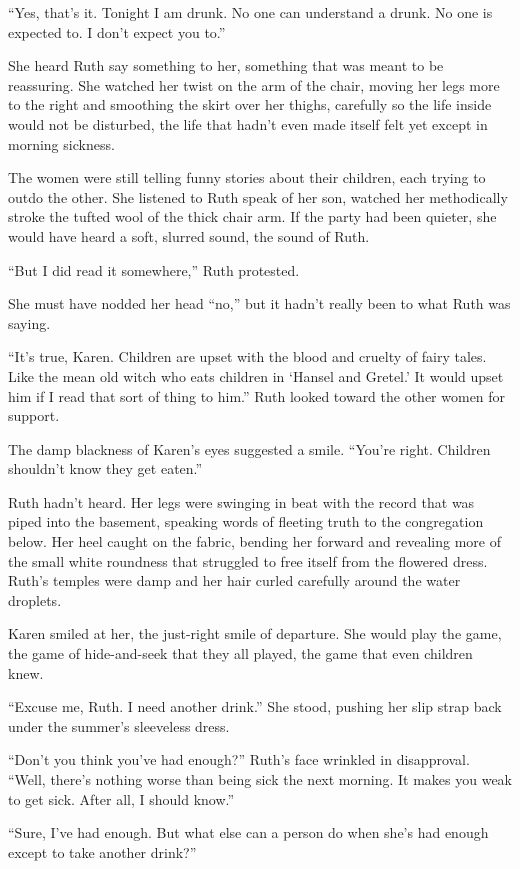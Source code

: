 \documentclass[
]{article}
\begin{document}
``Yes, that's it. Tonight I am drunk. No one can understand a drunk. No
one is expected to. I don't expect you to.''

She heard Ruth say something to her, something that was meant to be
reassuring. She watched her twist on the arm of the chair, moving her
legs more to the right and smoothing the skirt over her thighs,
carefully so the life inside would not be disturbed, the life that
hadn't even made itself felt yet except in morning sickness.

The women were still telling funny stories about their children, each
trying to outdo the other. She listened to Ruth speak of her son,
watched her methodically stroke the tufted wool of the thick chair arm.
If the party had been quieter, she would have heard a soft, slurred
sound, the sound of Ruth.

``But I did read it somewhere,'' Ruth protested.

She must have nodded her head ``no,'' but it hadn't really been to what
Ruth was saying.

``It's true, Karen. Children are upset with the blood and cruelty of
fairy tales. Like the mean old witch who eats children in `Hansel and
Gretel.' It would upset him if I read that sort of thing to him.'' Ruth
looked toward the other women for support.

The damp blackness of Karen's eyes suggested a smile. ``You're right.
Children shouldn't know they get eaten.''

Ruth hadn't heard. Her legs were swinging in beat with the record that
was piped into the base­ment, speaking words of fleeting truth to the
congregation below. Her heel caught on the fabric, bend­ing her forward
and revealing more of the small white roundness that struggled to free
itself from the flowered dress. Ruth's temples were damp and her hair
curled carefully around the water droplets.

Karen smiled at her, the just-right smile of departure. She would play
the game, the game of hide-and-seek that they all played, the game that
even children knew.

``Excuse me, Ruth. I need another drink.'' She stood, pushing her slip
strap back under the summer's sleeveless dress.

``Don't you think you've had enough?'' Ruth's face wrinkled in
disapproval. ``Well, there's nothing worse than being sick the next
morning. It makes you weak to get sick. After all, I should know.''

``Sure, I've had enough. But what else can a person do when she's had
enough except to take another drink?''
\end{document}
